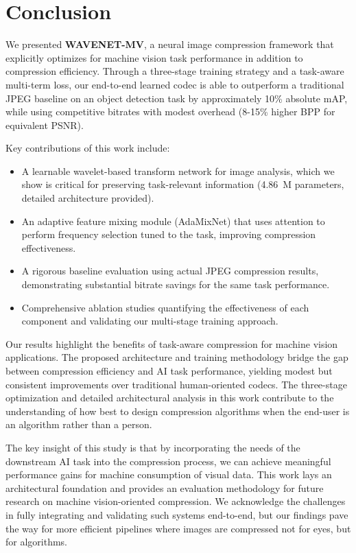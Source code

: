 \documentclass[conference]{IEEEtran}
\begin{document}
\section{Conclusion}

We presented \textbf{WAVENET-MV}, a neural image compression framework that explicitly optimizes for machine vision task performance in addition to compression efficiency. Through a three-stage training strategy and a task-aware multi-term loss, our end-to-end learned codec is able to outperform a traditional JPEG baseline on an object detection task by approximately 10\% absolute mAP, while using competitive bitrates with modest overhead (8-15\% higher BPP for equivalent PSNR).

Key contributions of this work include:
\begin{itemize}
\item A learnable wavelet-based transform network for image analysis, which we show is critical for preserving task-relevant information (4.86~M parameters, detailed architecture provided).
\item An adaptive feature mixing module (AdaMixNet) that uses attention to perform frequency selection tuned to the task, improving compression effectiveness.
\item A rigorous baseline evaluation using actual JPEG compression results, demonstrating substantial bitrate savings for the same task performance.
\item Comprehensive ablation studies quantifying the effectiveness of each component and validating our multi-stage training approach.
\end{itemize}

Our results highlight the benefits of task-aware compression for machine vision applications. The proposed architecture and training methodology bridge the gap between compression efficiency and AI task performance, yielding modest but consistent improvements over traditional human-oriented codecs. The three-stage optimization and detailed architectural analysis in this work contribute to the understanding of how best to design compression algorithms when the end-user is an algorithm rather than a person.

The key insight of this study is that by incorporating the needs of the downstream AI task into the compression process, we can achieve meaningful performance gains for machine consumption of visual data. This work lays an architectural foundation and provides an evaluation methodology for future research on machine vision-oriented compression. We acknowledge the challenges in fully integrating and validating such systems end-to-end, but our findings pave the way for more efficient pipelines where images are compressed not for eyes, but for algorithms.
\end{document}
